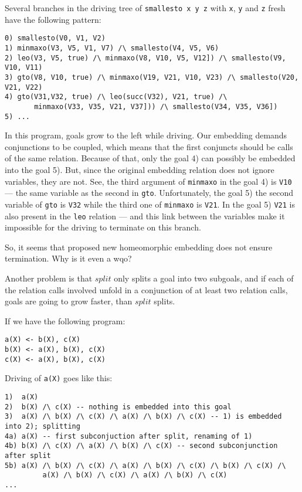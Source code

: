\documentclass{llncs}
\begin{document}
Several branches in the driving tree of \verb!smallesto x y z! with \verb!x!, \verb!y! and 
\verb!z! fresh have the following pattern: 

\begin{verbatim}
0) smallesto(V0, V1, V2)
1) minmaxo(V3, V5, V1, V7) /\ smallesto(V4, V5, V6)
2) leo(V3, V5, true) /\ minmaxo(V8, V10, V5, V12]) /\ smallesto(V9, V10, V11)
3) gto(V8, V10, true) /\ minmaxo(V19, V21, V10, V23) /\ smallesto(V20, V21, V22)
4) gto(V31,V32, true) /\ leo(succ(V32), V21, true) /\ 
       minmaxo(V33, V35, V21, V37])) /\ smallesto(V34, V35, V36])
5) ... 
\end{verbatim}

In this program, goals grow to the left while driving. Our embedding demands conjunctions to be coupled, which means that the first conjuncts should be calls of the same relation. Because of that, only the goal 4) can possibly be embedded into the goal 5). But, since the original embedding relation does not ignore variables, they are not. See, the third argument of \verb!minmaxo! in the goal 4) is \verb!V10! --- the same variable as the second in \verb!gto!. Unfortunately, the goal 5) the second variable of \verb!gto! is \verb!V32! while the third one of \verb!minmaxo! is \verb!V21!. In the goal 5) \verb!V21! is also present in the \verb!leo! relation --- and this link between the variables make it impossible for the driving to terminate on this branch. 

So, it seems that proposed new homeomorphic embedding does not ensure termination. Why is it even a wqo? 

Another problem is that $split$ only splits a goal into two subgoals, and if each of the relation calls involved unfold in a conjunction of at least two relation calls, goals are going to grow faster, than $split$ splits. 

If we have the following program: 

\begin{verbatim}
a(X) <- b(X), c(X)
b(X) <- a(X), b(X), c(X)
c(X) <- a(X), b(X), c(X)
\end{verbatim}

Driving of \verb!a(X)! goes like this: 

\begin{verbatim}
1)  a(X)
2)  b(X) /\ c(X) -- nothing is embedded into this goal
3)  a(X) /\ b(X) /\ c(X) /\ a(X) /\ b(X) /\ c(X) -- 1) is embedded into 2); splitting
4a) a(X) -- first subconjuction after split, renaming of 1)
4b) b(X) /\ c(X) /\ a(X) /\ b(X) /\ c(X) -- second subconjunction after split
5b) a(X) /\ b(X) /\ c(X) /\ a(X) /\ b(X) /\ c(X) /\ b(X) /\ c(X) /\ 
         a(X) /\ b(X) /\ c(X) /\ a(X) /\ b(X) /\ c(X) 
...
\end{verbatim}
\end{document}
